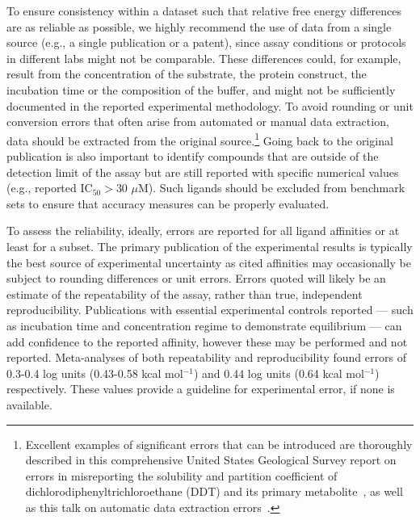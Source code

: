 \documentclass[9pt,bestpractices]{livecoms}
\begin{document}
To ensure consistency within a dataset such that relative free energy differences are as reliable as possible, we highly recommend the use of data from a single source (e.g., a single publication or a patent), since assay conditions or protocols in different labs might not be comparable. 
These differences could, for example, result from the concentration of the substrate, the protein construct, the incubation time or the composition of the buffer, and might not be sufficiently documented in the reported experimental methodology. 
To avoid rounding or unit conversion errors that often arise from automated or manual data extraction, data should be extracted from the original source.\footnote{Excellent examples of significant errors that can be introduced are thoroughly described in this comprehensive United States Geological Survey report on errors in misreporting the solubility and partition coefficient of dichlorodiphenyltrichloroethane (DDT) and its primary metabolite~\cite{pontolillo2001search}, as well as this talk on automatic data extraction errors~\cite{daga_pankaj_r_2019_3445476}.}
Going back to the original publication is also important to identify compounds that are outside of the detection limit of the assay but are still reported with specific numerical values (e.g., reported IC$_{50} > 30 \,\,\mu$M). Such ligands should be excluded from benchmark sets to ensure that accuracy measures can be properly evaluated.

To assess the reliability, ideally, errors are reported for all ligand affinities or at least for a subset. The primary publication of the experimental results is typically the best source of experimental uncertainty as cited affinities may occasionally be subject to rounding differences or unit errors\cite{kramer2012experimental}. Errors quoted will likely be an estimate of the repeatability of the assay, rather than true, independent reproducibility. Publications with essential experimental controls reported --- such as incubation time and concentration regime to demonstrate equilibrium --- can add confidence to the reported affinity, however these may be performed and not reported\cite{jarmoskaite2020measure}. Meta-analyses of both repeatability\cite{sheridan2020experimental} and reproducibility\cite{kramer2012experimental} found errors of 0.3-0.4 log units (0.43-0.58 kcal mol$^{-1}$) and 0.44 log units (0.64 kcal mol$^{-1}$) respectively. These values provide a guideline for experimental error, if none is available.
\end{document}
